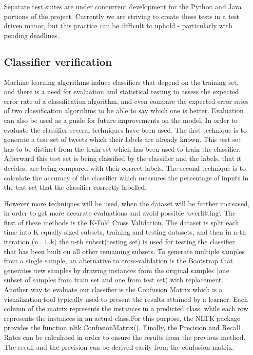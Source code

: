 Separate test suites are under concurrent development for the Python and Java
portions of the project. Currently we are striving to create these tests in a
test driven manor, but this practice can be difficult to uphold - particularly
with pending deadlines.

\subsection{Classifier verification}
Machine learning algorithms induce classifiers that depend on the training set,
and there is a need for evaluation and statistical testing to assess the
expected error rate of a classification algorithm, and even compare the
expected error rates of two classification algorithms to be able to say which
one is better. Evaluation can also be used as a guide for future improvements
on the model. In order to evaluate the classifier several techniques have been
used. The first technique is to generate a test set of tweets which their
labels are already known. This test set has to be distinct from the train set
which has been used to train the classifier. Afterward this test set is being
classified by the classifier and the labels, that it decides, are being
compared with their correct labels. The second technique is to calculate the
accuracy of the classifier which measures the percentage of inputs in the test
set that the classifier correctly labelled.

However more techniques will be used, when the dataset will be further
increased, in order to get more accurate evaluations and avoid possible
`overfitting'. The first of these methods is the K-Fold Cross Validation. The
dataset is split each time into K equally sized subsets, training and testing
datasets, and then in n-th iteration (n=1..k) the n-th subset(testing set) is
used for testing the classifier that has been built on all other remaining
subsets. To generate multiple samples from a single sample, an alternative to
cross-validation is the Bootstrap that generates new samples by drawing
instances from the original samples (one subset of samples from train set and one from test set)
 with replacement. Another way to evaluate our classifier is the
Confusion Matrix which is a visualization tool typically used to present the
results attained by a learner. Each column of the matrix represents the
instances in a predicted class, while each row represents the instances in an
actual class.For this purpose, the NLTK package provides the function
nltk.ConfusionMatrix(). Finally, the Precision and Recall Rates can be
calculated in order to ensure the results from the previous method. The recall
and the precision can be derived easily from the confusion matrix.
